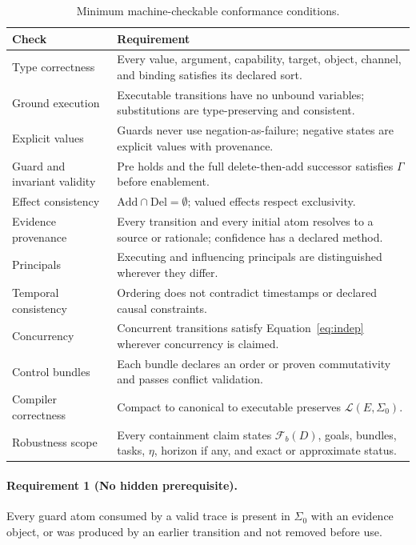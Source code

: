 \documentclass[11pt,letterpaper]{article}
\theoremstyle{definition}
\newcommand{\St}{\Sigma}
\newcommand{\Inv}{\Gamma}
\newcommand{\Pre}{\mathrm{Pre}}
\newcommand{\Add}{\mathrm{Add}}
\newcommand{\Del}{\mathrm{Del}}
\newcommand{\Lang}{\mathcal{L}}
\newcommand{\Fam}{\mathcal{F}}
\begin{document}
\begin{table}[t]
\centering\small
\caption{Minimum machine-checkable conformance conditions.}\label{tab:conf}
\begin{tabularx}{\textwidth}{@{}l X@{}}
\toprule
Check & Requirement \\
\midrule
Type correctness & Every value, argument, capability, target, object, channel, and binding satisfies its declared sort. \\
Ground execution & Executable transitions have no unbound variables; substitutions are type-preserving and consistent. \\
Explicit values & Guards never use negation-as-failure; negative states are explicit values with provenance. \\
Guard and invariant validity & $\Pre$ holds and the full delete-then-add successor satisfies $\Inv$ before enablement. \\
Effect consistency & $\Add\cap\Del=\emptyset$; valued effects respect exclusivity. \\
Evidence provenance & Every transition and every initial atom resolves to a source or rationale; confidence has a declared method. \\
Principals & Executing and influencing principals are distinguished wherever they differ. \\
Temporal consistency & Ordering does not contradict timestamps or declared causal constraints. \\
Concurrency & Concurrent transitions satisfy Equation~\eqref{eq:indep} wherever concurrency is claimed. \\
Control bundles & Each bundle declares an order or proven commutativity and passes conflict validation. \\
Compiler correctness & Compact to canonical to executable preserves $\Lang(E,\St_0)$. \\
Robustness scope & Every containment claim states $\Fam_b(D)$, goals, bundles, tasks, $\eta$, horizon if any, and exact or approximate status. \\
\bottomrule
\end{tabularx}
\end{table}

\paragraph{Requirement 1 (No hidden prerequisite).} Every guard atom consumed by a valid trace is present in $\St_0$ with an evidence object, or was produced by an earlier transition and not removed before use.
\end{document}
